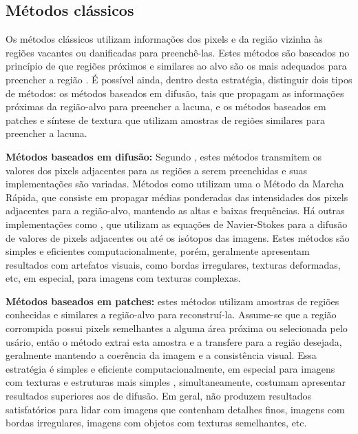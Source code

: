 \subsection{Métodos clássicos} \label{patch}
Os métodos clássicos utilizam informações dos pixels e da região vizinha às regiões  vacantes ou danificadas para preenchê-las. Estes métodos são baseados no princípio de que regiões próximos e similares ao alvo são os mais adequados para preencher a região \cite{patchmatch2009, Bertalmio2001navier}. É possível ainda, dentro desta estratégia, distinguir dois tipos de métodos: os métodos baseados em difusão, tais que propagam as informações próximas da região-alvo para preencher a lacuna, e os métodos baseados em patches e síntese de textura que utilizam amostras de regiões similares para preencher a lacuna.

\begin{list}{}{}

  \item \textbf{Métodos baseados em difusão:} \label{diffusion}
Segundo \cite{black2020evaluation}, estes métodos transmitem os valores dos pixels adjacentes para as regiões a serem preenchidas e suas implementações são variadas. Métodos como \cite{Telea2004} utilizam uma o Método da Marcha Rápida, que consiste em propagar médias ponderadas das intensidades dos pixels adjacentes para a região-alvo, mantendo as altas e baixas frequências. Há outras implementações como \cite{Bertalmio2001navier}, que utilizam as equações de Navier-Stokes para a difusão de valores de pixels adjacentes ou até os isótopos das imagens. Estes métodos são simples e eficientes computacionalmente, porém, geralmente apresentam resultados com artefatos visuais, como bordas irregulares, texturas deformadas, etc, em especial, para imagens com texturas complexas.

  \item \textbf{Métodos baseados em patches:} \label{sample}
estes métodos utilizam amostras de regiões conhecidas e similares a região-alvo para reconstruí-la. Assume-se que a região corrompida possui pixels semelhantes a alguma área próxima ou selecionada pelo usário, então o método extrai esta amostra e a transfere para a região desejada, geralmente mantendo a coerência da imagem e a consistência visual. Essa estratégia é simples e eficiente computacionalmente, em especial para imagens com texturas e estruturas mais simples \cite{patchmatch2009}, simultaneamente, costumam apresentar resultados superiores aos de difusão. Em geral, não produzem resultados satisfatórios para lidar com imagens que contenham detalhes finos, imagens com bordas irregulares, imagens com objetos com texturas semelhantes, etc.


\end{list}
